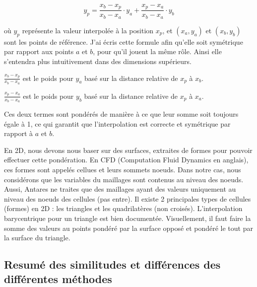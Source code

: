 \[
y_p = \frac{x_b - x_p}{x_b - x_a} \cdot y_a + \frac{x_p - x_a}{x_b - x_a} \cdot y_b
\]

où \( y_p \) représente la valeur interpolée à la position \( x_p \), et \((x_a, y_a)\) et \((x_b, y_b)\) sont les points de référence. J'ai écris cette formule afin qu'elle soit symétrique par rapport aux points \( a \) et \( b \), pour qu'il jouent la même rôle. Ainsi elle s'entendra plus intuitivement dans des dimensions supérieurs.

        \( \frac{x_b - x_p}{x_b - x_a} \) est le poids pour \( y_a \) basé sur la distance relative de \( x_p \) à \( x_b \).

        \( \frac{x_p - x_a}{x_b - x_a} \) est le poids pour \( y_b \) basé sur la distance relative de \( x_p \) à \( x_a \).%

Ces deux termes sont pondérés de manière à ce que leur somme soit toujours égale à 1, ce qui garantit que l'interpolation est correcte et symétrique par rapport à \( a \) et \( b \).

En 2D, nous devons nous baser sur des surfaces, extraites de formes pour pouvoir effectuer cette pondération. En CFD (Computation Fluid Dynamics en anglais), ces formes sont appelés cellues et leurs sommets noeuds. Dans notre cas, nous considérons que les variables du maillages sont contenus au niveau des noeuds. Aussi, Antares ne traites que des maillages ayant des valeurs uniquement au niveau des noeuds des cellules (pas entre).
Il existe 2 principales types de cellules (formes) en 2D : les triangles et les quadrilatères (non croisés).
L'interpolation barycentrique pour un triangle est bien documentée. Visuellement, il faut faire la somme des valeurs au points pondéré par la surface opposé et pondéré le tout par la surface du triangle. %




\subsection{Resumé des similitudes et différences des différentes méthodes}



